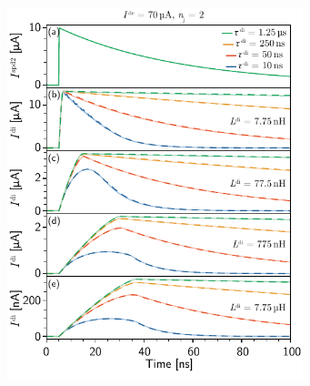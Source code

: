 \documentclass[twocolumn]{article}
\begin{document}

\begin{figure}[h!]
\includegraphics[width=8.6cm]{figures/_fig__synapses__comparison__2jj__single_pulse.pdf}
\end{figure}
\end{document}
